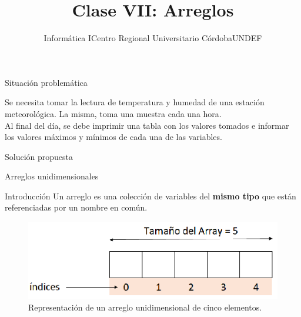 \documentclass[xcolor=pdftex,table,11pt]{beamer}
\author{Informática I\newline Centro Regional Universitario Córdoba\newline UNDEF }
\title{Clase VII: \newline Arreglos}
\begin{document}
\begin{frame}
\titlepage
\end{frame}

\begin{frame}{Situación problemática}

\begin{block}{}
Se necesita tomar la lectura de temperatura y humedad de una estación meteorológica. La misma, toma una muestra cada una hora. \\
Al final del día, se debe imprimir una tabla con los valores tomados e informar los valores máximos y mínimos de cada una de las variables.
\end{block}
\end{frame}

\begin{frame}{Solución propuesta}


\codesetstylefrombeamer
{}

\end{frame}

\begin{frame}{Arreglos unidimensionales}
\begin{block}{Introducción}
Un arreglo es una colección de variables del \textbf{mismo tipo} que están referenciadas por un nombre en común. 
\end{block}

\begin{figure}
 \centering
\includegraphics[scale=0.5]{../img/exported/arrays.png}
\caption{Representación de un arreglo unidimensional de cinco elementos.}
\end{figure}
\end{frame}
\end{document}
